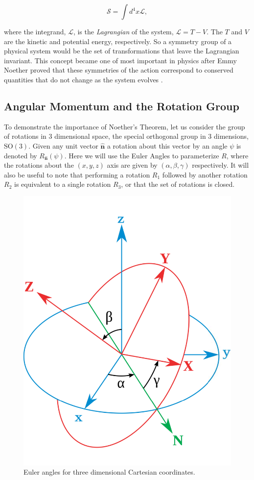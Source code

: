 \begin{equation}
\label{eq:action}
\mathcal{S} = \int d^{4}x{\mathscr{L}},
\end{equation}

where the integrand, $\mathscr{L}$, is the \textit{Lagrangian} of the system, $\mathscr{L} = T - V$. The $T$ and $V$ are the kinetic and potential energy, respectively. So a symmetry group of a physical system would be the set of transformations that leave the Lagrangian invariant. This concept became one of most important in physics after Emmy Noether proved that these symmetries of the action correspond to conserved quantities that do not change as the system evolves \cite{Noether:1918zz}.

\subsection{Angular Momentum and the Rotation Group}
\label{sec:AngularMomentum}

To demonstrate the importance of Noether's Theorem, let us consider the group of rotations in 3 dimensional space, the special orthogonal group in 3 dimensions, $\mathrm{SO}(3)$. Given any unit vector $\hat{\textbf{n}}$ a rotation about this vector by an angle $\psi$ is denoted by $R_{\hat{\textbf{n}}}(\psi)$. Here we will use the Euler Angles to parameterize $R$, where the rotations about the $(x,y,z)$ axis are given by $(\alpha, \beta, \gamma)$ respectively. It will also be useful to note that performing a rotation $R_{1}$ followed by another rotation $R_{2}$ is equivalent to a single rotation $R_{3}$, or that the set of rotations is closed.

\begin{figure}
\begin{center}
\includegraphics[width=0.35\linewidth]{Introduction/Euler.pdf}
\caption[Euler angles for three dimensional Cartesian coordinates.]{Euler angles for three dimensional Cartesian coordinates.\cite{wiki:Euler}}
\label{fig:Euler}
\end{center}
\end{figure}


